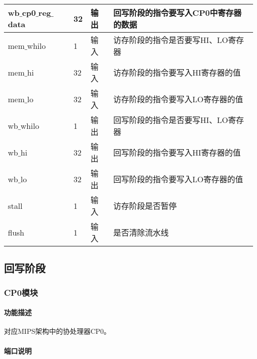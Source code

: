 \begin{table}[H]
\begin{tabular}{|l|l|l|l|}
		\hline
		wb$\_$cp0$\_$reg$\_$data & 32 & 输出 & 回写阶段的指令要写入CP0中寄存器的数据 \\
		\hline
		mem$\_$whilo & 1 & 输入 & 访存阶段的指令是否要写HI、LO寄存器 \\
		\hline
		mem$\_$hi & 32 & 输入 & 访存阶段的指令要写入HI寄存器的值 \\
		\hline
		mem$\_$lo & 32 & 输入 & 访存阶段的指令要写入LO寄存器的值 \\
		\hline
		wb$\_$whilo & 1 & 输出 & 回写阶段的指令是否要写HI、LO寄存器 \\
		\hline
		wb$\_$hi & 32 & 输出 & 回写阶段的指令要写入HI寄存器的值 \\
		\hline
		wb$\_$lo & 32 & 输出 & 回写阶段的指令要写入LO寄存器的值 \\
		\hline
		stall & 1 & 输入 & 访存阶段是否暂停 \\
		\hline
		flush & 1 & 输入 & 是否清除流水线 \\
		\hline
	\end{tabular}
\end{table}
\subsection{回写阶段}
\subsubsection{CP0模块}
\paragraph{功能描述}
\quad

\quad

对应MIPS架构中的协处理器CP0。
\paragraph{端口说明}
\quad

